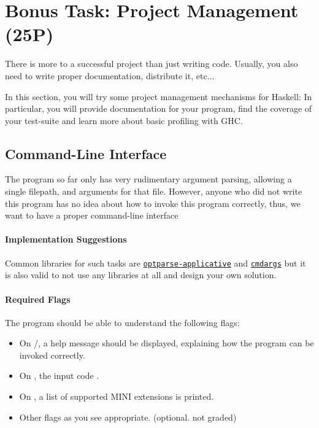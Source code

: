 \documentclass{article}
\begin{document}
\section{Bonus Task: Project Management (25P)}

There is more to a successful project than just writing code. Usually, you also need to write proper documentation, distribute it, etc...

In this section, you will try some project management mechanisms for Haskell: In particular, you will provide documentation for your program, 
find the coverage of your test-suite and learn more about basic profiling with GHC.

\subsection{Command-Line Interface}

The program so far only has very rudimentary argument parsing, allowing a single filepath, and arguments for that file.
However, anyone who did not write this program has no idea about how to invoke this program correctly, thus, we want to have a proper command-line interface

\paragraph{Implementation Suggestions}

Common libraries for such tasks are \href{https://hackage.haskell.org/package/optparse-applicative}{\texttt{optparse-applicative}} 
and \href{https://hackage.haskell.org/package/cmdargs}{\texttt{cmdargs}} but it is also valid to not use any libraries at all 
and design your own solution.

\paragraph{Required Flags}

The program should be able to understand the following flags:

\begin{itemize}
\item On /, a help message should be displayed, explaining how the program can be invoked correctly.
\item On , the input code .
\item On , a list of supported MINI extensions is printed.
\item Other flags as you see appropriate. (optional. not graded)
\end{itemize}
\end{document}
